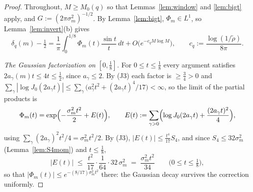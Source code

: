 \begin{proof}
Throughout, $M\ge M_0(q)$ so that Lemmas~\ref{lem:window} and
\ref{lem:bigt} apply, and $G:=(2\pi\sigma_m^2)^{-1/2}$. By
Lemma~\ref{lem:bigt}, $\Phi_m\in L^1$, so Lemma~\ref{lem:invert}(b)
gives
\begin{equation}\label{eq:GP}
\delta_q(m)-\tfrac12
=\frac1\pi\int_0^{1/8}\Phi_m(t)\frac{\sin t}t\,dt
+O\bigl(e^{-c_qM\log M}\bigr),
\qquad c_q:=\frac{\log(1/\tilde\rho)}{8\pi}.
\end{equation}

\emph{The Gaussian factorization on $[0,\tfrac18]$.} For
$0\le t\le\tfrac18$ every argument satisfies
$2a_\gamma(m)t\le4t\le\tfrac12$, since $a_\gamma\le2$. By (J3) each
factor is $\ge\tfrac34>0$ and
$\sum_\gamma|\log J_0(2a_\gamma t)|\le\sum_\gamma\bigl(a_\gamma^2t^2
+(2a_\gamma t)^4/17\bigr)<\infty$, so the limit of the partial
products is
\begin{equation}\label{eq:smallt}
\Phi_m(t)=\exp\Bigl(-\frac{\sigma_m^2t^2}{2}+E(t)\Bigr),
\qquad
E(t):=\sum_{\gamma>0}\Bigl(\log J_0(2a_\gamma t)
+\frac{(2a_\gamma t)^2}{4}\Bigr),
\end{equation}
using $\sum_\gamma(2a_\gamma)^2t^2/4=\sigma_m^2t^2/2$. By (J3),
$|E(t)|\le\tfrac{t^4}{17}S_4$, and since $S_4\le32\sigma_m^2$
(Lemma~\ref{lem:S4mom}) and $t\le\tfrac18$,
\begin{equation}\label{eq:Eunif}
|E(t)|\;\le\;\frac{t^2}{17}\cdot\frac{1}{64}\cdot32\,\sigma_m^2
\;=\;\frac{\sigma_m^2t^2}{34}
\qquad\bigl(0\le t\le\tfrac18\bigr),
\end{equation}
so that $|\Phi_m(t)|\le e^{-(8/17)\sigma_m^2t^2}$ there: the Gaussian
decay survives the correction uniformly.


\end{proof}
